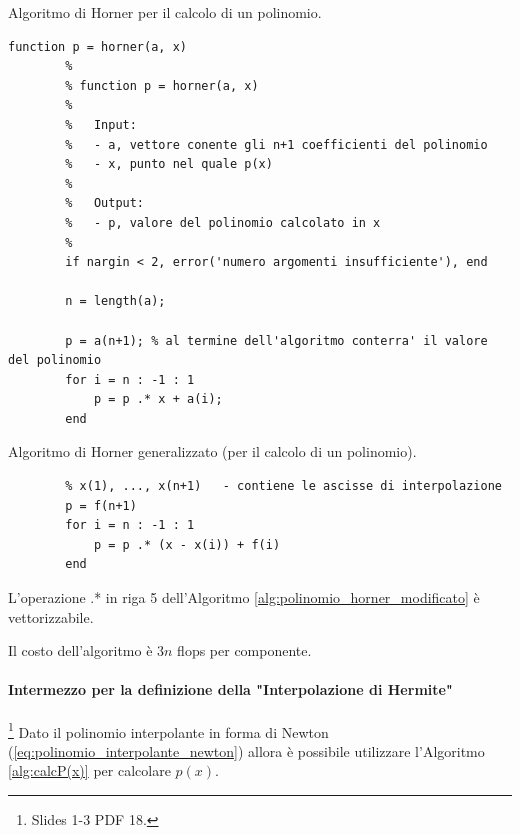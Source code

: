 \begin{algorithm}
\caption{Algoritmo di Horner per il calcolo di un polinomio.}\label{alg:metodo_horner}
    \begin{lstlisting}[style=Matlab-editor]
    	function p = horner(a, x)
    	%
    	% function p = horner(a, x)
    	%
    	%	Input: 
    	%	- a, vettore conente gli n+1 coefficienti del polinomio
    	%	- x, punto nel quale p(x)
    	%
    	%	Output:
    	%	- p, valore del polinomio calcolato in x
    	%
    	if nargin < 2, error('numero argomenti insufficiente'), end 
    	
    	n = length(a);
    	
        p = a(n+1); % al termine dell'algoritmo conterra' il valore del polinomio
        for i = n : -1 : 1
            p = p .* x + a(i);
        end
    \end{lstlisting}
\end{algorithm}

\begin{algorithm}
\caption{Algoritmo di Horner generalizzato (per il calcolo di un polinomio).}\label{alg:polinomio_horner_modificato}
    \begin{lstlisting}[style=Matlab-editor]
        % f(1), ..., f(n+1)   - calcolato dal codice precedente per le differenze divise
        % x(1), ..., x(n+1)   - contiene le ascisse di interpolazione
        p = f(n+1) 
        for i = n : -1 : 1
            p = p .* (x - x(i)) + f(i)
        end
    \end{lstlisting}
\end{algorithm}

\begin{remark}
    L'operazione .* in riga 5 dell'Algoritmo \ref{alg:polinomio_horner_modificato} è vettorizzabile.
\end{remark}

\begin{remark}
    Il costo dell'algoritmo è $3n$ flops per componente.
\end{remark}

\paragraph{Intermezzo per la definizione della "Interpolazione di Hermite"}\footnote{Slides 1-3 PDF 18.} Dato il polinomio interpolante in forma di Newton (\ref{eq:polinomio_interpolante_newton}) allora è possibile utilizzare l'Algoritmo \ref{alg:calcP(x)} per calcolare $p(x)$.

